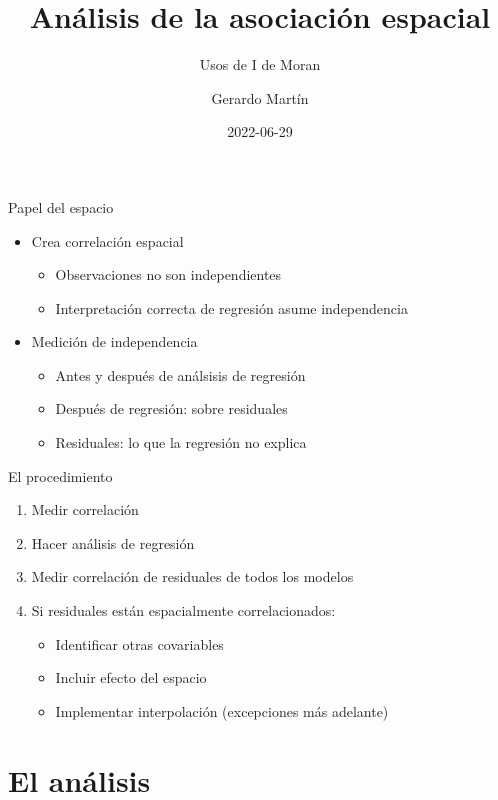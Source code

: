 \documentclass[
  11pt,
  ignorenonframetext,
]{beamer}
\title{Análisis de la asociación espacial}
\subtitle{Usos de I de Moran}
\author{Gerardo Martín}
\date{2022-06-29}
\begin{document}
\frame{\titlepage}

\begin{frame}{Papel del espacio}
\protect\hypertarget{papel-del-espacio}{}
\begin{itemize}
\item
  Crea correlación espacial

  \begin{itemize}
  \item
    Observaciones no son independientes
  \item
    Interpretación correcta de regresión asume independencia
  \end{itemize}
\item
  Medición de independencia

  \begin{itemize}
  \item
    Antes y después de análsisis de regresión
  \item
    Después de regresión: sobre residuales
  \item
    Residuales: lo que la regresión no explica
  \end{itemize}
\end{itemize}
\end{frame}

\begin{frame}{El procedimiento}
\protect\hypertarget{el-procedimiento}{}
\begin{enumerate}
\item
  Medir correlación
\item
  Hacer análisis de regresión
\item
  Medir correlación de residuales de todos los modelos
\item
  Si residuales están espacialmente correlacionados:

  \begin{itemize}
  \item
    Identificar otras covariables
  \item
    Incluir efecto del espacio
  \item
    Implementar interpolación (excepciones más adelante)
  \end{itemize}
\end{enumerate}
\end{frame}

\hypertarget{el-anuxe1lisis}{%
\section{El análisis}\label{el-anuxe1lisis}}
\end{document}
